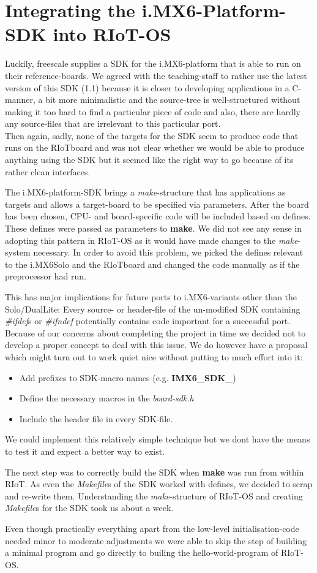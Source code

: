 \section{Integrating the i.MX6-Platform-SDK into RIoT-OS}

Luckily, freescale supplies a SDK for the i.MX6-platform that is able to run on their
reference-boards. We agreed with the teaching-staff to rather use the latest version of
this SDK (1.1) because it is closer to developing applications in a C-manner, a bit more
minimalistic and the source-tree is well-structured without making it too hard to find a
particular piece of code and also, there are hardly any source-files that are irrelevant
to this particular port.
\\
Then again, sadly, none of the targets for the SDK seem to produce code that runs on the
RIoTboard and was not clear whether we would be able to produce anything using the SDK
but it seemed like the right way to go because of its rather clean interfaces.

The i.MX6-platform-SDK brings a \textit{make}-structure that has applications as targets
and allows a target-board to be specified via parameters.
After the board has been chosen, CPU- and board-specific code will be included based on
defines.
These defines were passed as parameters to \textbf{make}. We did not see any sense in
adopting this pattern in RIoT-OS as it would have made changes to the
\textit{make}-system necessary.
In order to avoid this problem, we picked the defines relevant to the i.MX6Solo and the
RIoTboard and changed the code manually as if the preprocessor had run.

This has major implications for future ports to i.MX6-variants other than the
Solo/DualLite: Every source- or header-file of the un-modified SDK containing
\textit{\#ifdef}s or \textit{\#ifndef} potentially contains code important for a successful
port.
Because of our concerns about completing the project in time we decided not to develop a
proper concept to deal with this issue.
We do however have a proposal which might turn out to work quiet nice without putting to
much effort into it:
\begin{itemize}
\item Add prefixes to SDK-macro names (e.g. \textbf{IMX6\_SDK\_})
\item Define the necessary macros in the \textit{board-sdk.h}
\item Include the header file in every SDK-file.
\end{itemize}
We could implement this relatively simple technique but we dont have the means to test
it and expect a better way to exist.

The next step was to correctly build the SDK when \textbf{make} was run from within RIoT.
As even the \textit{Makefile}s of the SDK worked with defines, we decided to scrap and
re-write them. Understanding the \textit{make}-structure of RIoT-OS and creating
\textit{Makefile}s for the SDK took us about a week.

Even though practically everything apart from the low-level initialisation-code needed
minor to moderate adjustments we were able to skip the step of building a minimal program
and go directly to builing the hello-world-program of RIoT-OS.
